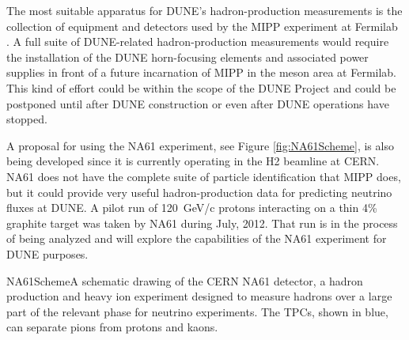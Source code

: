 The most suitable apparatus for DUNE's hadron-production measurements
is the collection of equipment and detectors used by the MIPP experiment at Fermilab~
\cite{Isenhower:2006zp}.   
A full suite of DUNE-related
hadron-production measurements would require the installation of the DUNE horn-focusing
elements and associated power supplies in front of a future
incarnation of MIPP in the meson area at Fermilab.
This kind of effort could be within the scope of the DUNE Project and could be postponed
until after DUNE construction or even after DUNE operations have
stopped. 

A proposal for using the NA61 experiment, see Figure \ref{fig:NA61Scheme}, 
is also being developed since it is currently operating
in the H2 beamline at CERN. NA61 does not have the complete suite of particle identification that MIPP does, but it could provide very useful hadron-production data for predicting neutrino fluxes at DUNE.
A pilot run of 120~GeV/c protons interacting on a thin 4\% graphite target 
was taken by NA61 during July, 2012. That run is in the process of being analyzed and will explore the capabilities of the NA61 experiment for DUNE purposes. 

\begin{cdrfigure}{NA61Scheme}{A schematic drawing of the CERN NA61 detector, a hadron production and heavy ion experiment 
designed to measure hadrons over a large part of the relevant phase for 
neutrino experiments. The TPCs, shown in blue, can separate pions from protons 
and kaons.}
\end{cdrfigure}
